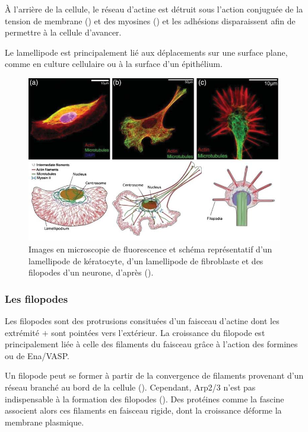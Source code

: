 À l'arrière de la cellule, le réseau d'actine est détruit sous l'action conjuguée de la tension de membrane (\cite{raucher_cell_2000}) et des myosines (\cite{wilson_myosin_2010}) et les adhésions disparaissent afin de permettre à la cellule d'avancer.

Le lamellipode est principalement lié aux déplacements sur une surface plane, comme en culture cellulaire ou à la surface d'un épithélium. 

\begin{figure}
\includegraphics[scale=0.5]{Figures/lamellipode.png}
\caption{Images en microscopie de fluorescence et schéma représentatif d'un lamellipode de kératocyte, d'un lamellipode de fibroblaste et des filopodes d'un neurone, d'après (\cite{huber_emergent_2013}). } 
\end{figure}


\subsubsection{Les filopodes}

Les filopodes sont des protrusions consituées d'un faisceau d'actine dont les extrémité $+$ sont pointées vers l'extérieur. 
La croissance du filopode est principalement liée à celle des filaments du faisceau grâce à l'action des formines ou de Ena/VASP. 

Un filopode peut se former à partir de la convergence de filaments provenant d'un réseau branché au bord de la cellule (\cite{small_actin_1995}). Cependant, Arp2/3 n'est pas indispensable à la formation des filopodes (\cite{wu_arp2/3_2012}). 
Des protéines comme la fascine associent alors ces filaments en faisceau rigide, dont la croissance déforme la membrane plasmique. 

